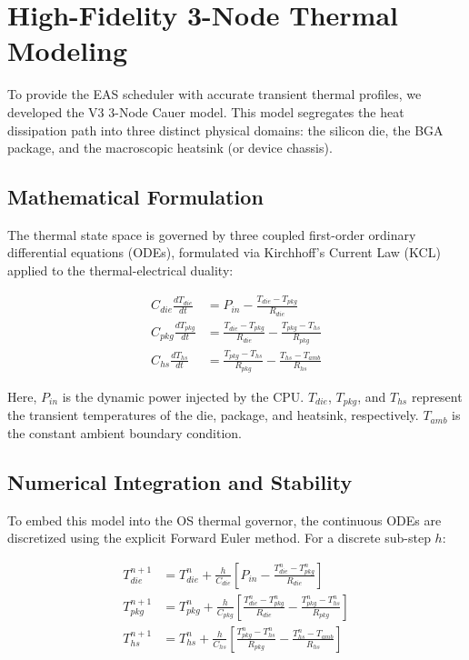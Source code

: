 \section{High-Fidelity 3-Node Thermal Modeling}
\label{sec:modeling}

To provide the EAS scheduler with accurate transient thermal profiles, we developed the V3 3-Node Cauer model. This model segregates the heat dissipation path into three distinct physical domains: the silicon die, the BGA package, and the macroscopic heatsink (or device chassis).

\subsection{Mathematical Formulation}

The thermal state space is governed by three coupled first-order ordinary differential equations (ODEs), formulated via Kirchhoff's Current Law (KCL) applied to the thermal-electrical duality:

\begin{align}
    C_{die} \frac{dT_{die}}{dt} &= P_{in} - \frac{T_{die} - T_{pkg}}{R_{die}} \label{eq:die} \\
    C_{pkg} \frac{dT_{pkg}}{dt} &= \frac{T_{die} - T_{pkg}}{R_{die}} - \frac{T_{pkg} - T_{hs}}{R_{pkg}} \label{eq:pkg} \\
    C_{hs} \frac{dT_{hs}}{dt} &= \frac{T_{pkg} - T_{hs}}{R_{pkg}} - \frac{T_{hs} - T_{amb}}{R_{hs}} \label{eq:hs}
\end{align}

Here, $P_{in}$ is the dynamic power injected by the CPU. $T_{die}$, $T_{pkg}$, and $T_{hs}$ represent the transient temperatures of the die, package, and heatsink, respectively. $T_{amb}$ is the constant ambient boundary condition.

\subsection{Numerical Integration and Stability}

To embed this model into the OS thermal governor, the continuous ODEs are discretized using the explicit Forward Euler method. For a discrete sub-step $h$:

\begin{align}
    T_{die}^{n+1} &= T_{die}^n + \frac{h}{C_{die}}\left[P_{in} - \frac{T_{die}^n - T_{pkg}^n}{R_{die}}\right] \\
    T_{pkg}^{n+1} &= T_{pkg}^n + \frac{h}{C_{pkg}}\left[\frac{T_{die}^n - T_{pkg}^n}{R_{die}} - \frac{T_{pkg}^n - T_{hs}^n}{R_{pkg}}\right] \\
    T_{hs}^{n+1} &= T_{hs}^n + \frac{h}{C_{hs}}\left[\frac{T_{pkg}^n - T_{hs}^n}{R_{pkg}} - \frac{T_{hs}^n - T_{amb}}{R_{hs}}\right]
\end{align}

